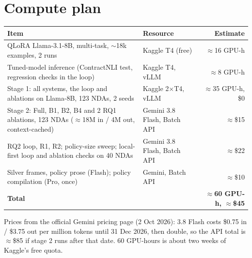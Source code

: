 \documentclass[11pt,a4paper]{article}
\begin{document}
\section{Compute plan}
\begin{table}[H]\small
\begin{tabularx}{\textwidth}{@{}LXr@{}}
\toprule
\textbf{Item} & \textbf{Resource} & \textbf{Estimate} \\
\midrule
QLoRA Llama-3.1-8B, multi-task, $\sim$18k examples, 2 runs & Kaggle T4 (free) & $\approx$16 GPU-h \\
Tuned-model inference (ContractNLI test, regression checks in the loop) & Kaggle T4, vLLM & $\approx$8 GPU-h \\
Stage 1: all systems, the loop and ablations on Llama-8B, 123 NDAs, 2 seeds & Kaggle 2$\times$T4, vLLM & $\approx$35 GPU-h, \$0 \\
Stage 2: Full, B1, B2, B4 and 2 RQ1 ablations, 123 NDAs ($\approx$18M in / 4M out, context-cached) & Gemini 3.8 Flash, Batch API & $\approx$\$15 \\
RQ2 loop, R1, R2; policy-size sweep; local-first loop and ablation checks on 40 NDAs & Gemini 3.8 Flash, Batch API & $\approx$\$22 \\
Silver frames, policy prose (Flash); policy compilation (Pro, once) & Gemini, Batch API & $\approx$\$10 \\
\midrule
\textbf{Total} & & \textbf{$\approx$60 GPU-h, $\approx$\$45} \\
\bottomrule
\end{tabularx}
\end{table}
\vspace{-4pt}
{\small Prices from the official Gemini pricing page (2 Oct 2026): 3.8 Flash costs \$0.75 in / \$3.75 out per million tokens until 31 Dec 2026, then double, so the API total is $\approx$\$85 if stage 2 runs after that date. 60 GPU-hours is about two weeks of Kaggle's free quota.}

\end{document}
